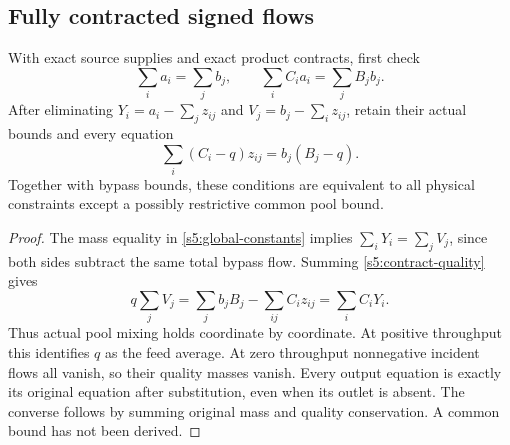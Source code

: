 \subsection{Fully contracted signed flows}\label{s5:scaled}

\begin{lemma}\label{s5:conservation}
With exact source supplies and exact product contracts, first check
\begin{equation}
 \sum_i a_i=\sum_j b_j,\qquad
 \sum_i C_i a_i=\sum_j B_jb_j.
 \label{s5:global-constants}
\end{equation}
After eliminating $Y_i=a_i-\sum_jz_{ij}$ and
$V_j=b_j-\sum_i z_{ij}$, retain their actual bounds and every equation
\begin{equation}
 \sum_i(C_i-q)z_{ij}=b_j(B_j-q).
 \label{s5:contract-quality}
\end{equation}
Together with bypass bounds, these conditions are equivalent to all
physical constraints except a possibly restrictive common pool bound.
\end{lemma}
\begin{proof}
The mass equality in \eqref{s5:global-constants} implies
$\sum_iY_i=\sum_jV_j$, since both sides subtract the same total bypass
flow. Summing \eqref{s5:contract-quality} gives
\[
 q\sum_jV_j=\sum_j b_jB_j-\sum_{ij}C_i z_{ij}
                         =\sum_i C_iY_i.
\]
Thus actual pool mixing holds coordinate by coordinate. At positive
throughput this identifies $q$ as the feed average. At zero throughput
nonnegative incident flows all vanish, so their quality masses vanish.
Every output equation is exactly its original equation after substitution,
even when its outlet is absent. The converse follows by summing original
mass and quality conservation. A common bound has not been derived.
\end{proof}

